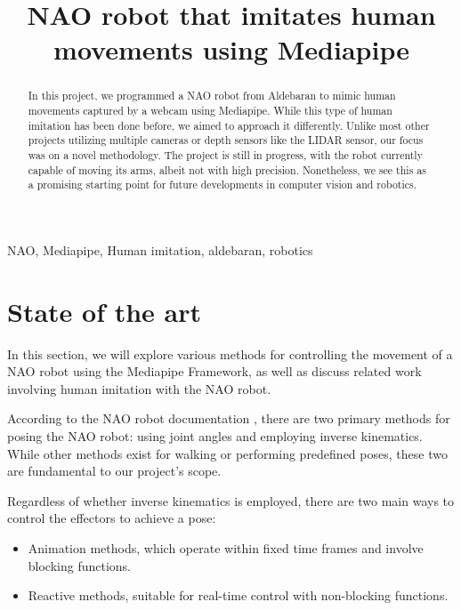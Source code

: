 \documentclass[conference]{IEEEtran}
\begin{document}
\title{NAO robot that imitates human movements using Mediapipe\\

}

\author{
}

\maketitle

\begin{abstract}
In this project, we programmed a NAO robot from Aldebaran to mimic human movements captured by a webcam using Mediapipe. While this type of human imitation has been done before, we aimed to approach it differently. Unlike most other projects utilizing multiple cameras or depth sensors like the LIDAR sensor, our focus was on a novel methodology.
The project is still in progress, with the robot currently capable of moving its arms, albeit not with high precision. Nonetheless, we see this as a promising starting point for future developments in computer vision and robotics.
\end{abstract}
\begin{IEEEkeywords}
NAO, Mediapipe, Human imitation, aldebaran, robotics
\end{IEEEkeywords}
\section{State of the art}
In this section, we will explore various methods for controlling the movement of a NAO robot using the Mediapipe Framework, as well as discuss related work involving human imitation with the NAO robot.

According to the NAO robot documentation \cite{b1}, there are two primary methods for posing the NAO robot: using joint angles and employing inverse kinematics. While other methods exist for walking or performing predefined poses, these two are fundamental to our project's scope.

Regardless of whether inverse kinematics is employed, there are two main ways to control the effectors to achieve a pose:
\begin{itemize}
    \item Animation methods, which operate within fixed time frames and involve blocking functions.
    \item Reactive methods, suitable for real-time control with non-blocking functions.
\end{itemize}
\end{document}
